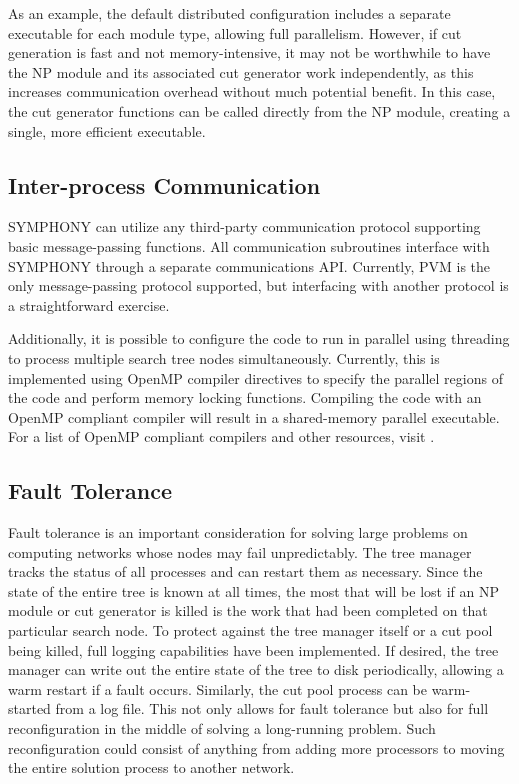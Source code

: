 As an example, the default distributed configuration includes a
separate executable for each module type, allowing full parallelism.
However, if cut generation is fast and not memory-intensive,
it may not be worthwhile to have the NP module and its associated cut
generator work independently, as this increases communication
overhead without much potential benefit. In this case, the cut
generator functions can be called directly from the NP module,
creating a single, more efficient executable.

\subsection{Inter-process Communication}

SYMPHONY can utilize any third-party communication protocol supporting basic
message-passing functions. All communication subroutines interface with
SYMPHONY through a separate communications API. Currently, PVM \cite{PVMbook}
is the only message-passing protocol supported, but interfacing with another
protocol is a straightforward exercise.

Additionally, it is possible to configure the code to run in parallel using
threading to process multiple search tree nodes simultaneously. Currently,
this is implemented using OpenMP compiler directives to specify the parallel
regions of the code and perform memory locking functions. Compiling the code
with an OpenMP compliant compiler will result in a shared-memory parallel
executable. For a list of OpenMP compliant compilers and other resources,
visit .

\subsection{Fault Tolerance}
\label{fault-tolerance} 

Fault tolerance is an important consideration for solving large problems on
computing networks whose nodes may fail unpredictably. The tree manager tracks
the status of all processes and can restart them as necessary. Since the state
of the entire tree is known at all times, the most that will be lost if an NP
module or cut generator is killed is the work that had been completed on that
particular search node. To protect against the tree manager itself or a cut
pool being killed, full logging capabilities have been implemented. If
desired, the tree manager can write out the entire state of the tree to disk
periodically, allowing a warm restart if a fault occurs. Similarly, the cut
pool process can be warm-started from a log file. This not only allows for
fault tolerance but also for full reconfiguration in the middle of solving a
long-running problem. Such reconfiguration could consist of anything from
adding more processors to moving the entire solution process to another
network.


